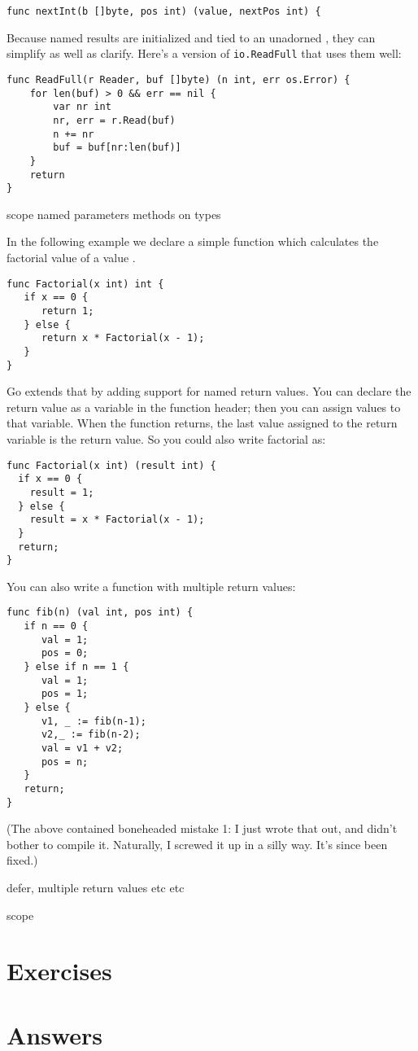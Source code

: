 \begin{lstlisting}
func nextInt(b []byte, pos int) (value, nextPos int) {
\end{lstlisting}
Because named results are initialized and tied to an unadorned
,
they can simplify as well as clarify. Here's a version of
\lstinline{io.ReadFull} that uses them well:

\begin{lstlisting}
func ReadFull(r Reader, buf []byte) (n int, err os.Error) {
    for len(buf) > 0 && err == nil {
        var nr int
        nr, err = r.Read(buf)
        n += nr
        buf = buf[nr:len(buf)]
    }
    return
}
\end{lstlisting}




scope
named parameters
methods on types

In the following example we declare a simple function which calculates
the factorial value of a value .

\begin{lstlisting}
func Factorial(x int) int {
   if x == 0 {
      return 1;	
   } else {
      return x * Factorial(x - 1);
   }
}
\end{lstlisting}

Go extends that by adding support for named return values. You can 
declare the return value as a variable in the function header; then you
can assign values to that variable. When the function returns, the last
value assigned to the return variable is the return value. So you could
also write factorial as:

\begin{lstlisting}
func Factorial(x int) (result int) {
  if x == 0 {
    result = 1;	
  } else {
    result = x * Factorial(x - 1);
  }
  return;
}
\end{lstlisting}
You can also write a function with multiple return values:

\begin{lstlisting}
func fib(n) (val int, pos int) {
   if n == 0 {
      val = 1;
      pos = 0;
   } else if n == 1 {
      val = 1;
      pos = 1;
   } else {
      v1, _ := fib(n-1);
      v2,_ := fib(n-2);
      val = v1 + v2;
      pos = n;
   }
   return;
}
\end{lstlisting}
(The above contained boneheaded mistake 1: I just wrote that out, and didn't bother to compile it. Naturally, I screwed it up in a silly way. It's since been fixed.)

defer, multiple return values etc etc

scope



\section{Exercises}






\cleardoublepage
\section{Answers}
\shipoutAnswer

